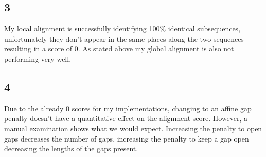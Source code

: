 \documentclass[12pt, oneside]{article}
\begin{document}
\subsection*{3}
My local alignment is successfully identifying 100\% identical subsequences, unfortunately they don't appear in the same places along the two sequences resulting in a score of 0. As stated above my global alignment is also not performing very well.

\subsection*{4} 
Due to the already 0 scores for my implementations, changing to an affine gap penalty doesn't have a quantitative effect on the alignment score. However, a manual examination shows what we would expect. Increasing the penalty to open gaps decreases the number of gaps, increasing the penalty to keep a gap open decreasing the lengths of the gaps present.
\end{document}
